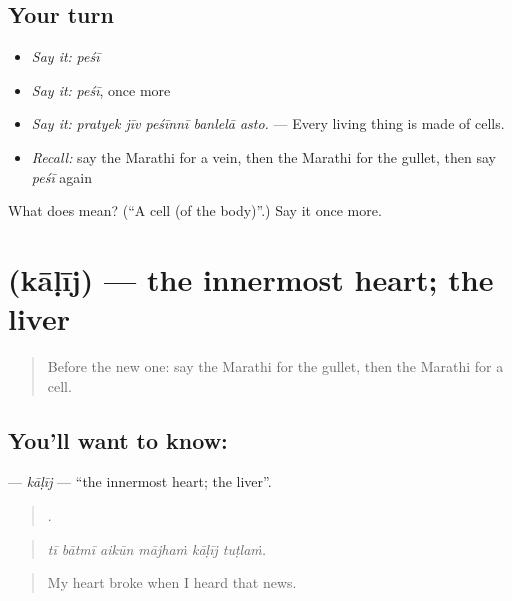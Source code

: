 \subsection*{Your turn}
\begin{itemize}
\raggedright
  \item \emph{Say it:} \emph{peśī}
  \item \emph{Say it:} \emph{peśī}, once more
  \item \emph{Say it:} \emph{pratyek jīv peśīnnī banlelā asto.} — Every living thing is made of cells.
  \item \emph{Recall:} say the Marathi for a vein, then the Marathi for the gullet, then say \emph{peśī} again
\end{itemize}

\begin{tcolorbox}[breakable,colback=teal!4,colframe=teal!35!black,title={Before you move on}]
What does  mean? (\textquotedblleft{}A cell (of the body)\textquotedblright{}.) Say it once more.
\end{tcolorbox}
\section[\texorpdfstring{\mr{काळीज} (kāḷīj)}{काळीज (kāḷīj)}]{ (kāḷīj) — the innermost heart; the liver}

\label{lesson:MR-C479-kalij}



\begin{quote}
Before the new one: say the Marathi for the gullet, then the Marathi for a cell.
\end{quote}

\subsection*{You'll want to know: }
\textbf{} — \emph{kāḷīj} — \textquotedblleft{}the innermost heart; the liver\textquotedblright{}.

\begin{quote}
     .
\end{quote}

\begin{quote}
\emph{tī bātmī aikūn mājhaṁ kāḷīj tuṭlaṁ.}
\end{quote}

\begin{quote}
My heart broke when I heard that news.
\end{quote}

